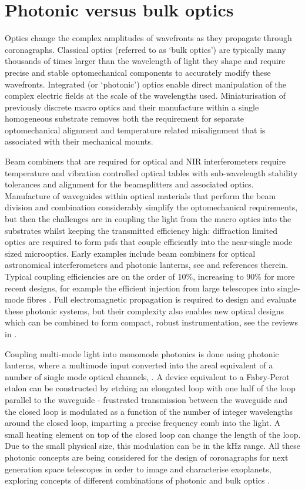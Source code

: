 \documentclass[letterpaper]{ar-1col}
\begin{document}
\section{Photonic versus bulk optics}

Optics change the complex amplitudes of wavefronts as they propagate through coronagraphs.
%
Classical optics (referred to as `bulk optics') are typically many thousands of times larger than the wavelength of light they shape and require precise and stable optomechanical components to accurately modify these wavefronts.
%
Integrated (or `photonic') optics enable direct manipulation of the complex electric fields at the scale of the wavelengths used.
%
Miniaturisation of previously discrete macro optics and their manufacture within a single homogeneous substrate removes both the requirement for separate optomechanical alignment and temperature related misalignment that is associated with their mechanical mounts.
%

Beam combiners that are required for optical and NIR interferometers require temperature and vibration controlled optical tables with sub-wavelength stability tolerances and alignment for the beamsplitters and associated optics.
%
Manufacture of waveguides within optical materials that perform the beam division and combination considerably simplify the optomechanical requirements, but then the challenges are in coupling the light from the macro optics into the substrates whilst keeping the transmitted efficiency high: diffraction limited optics are required to form \acp{psf} that couple efficiently into the near-single mode sized microoptics.
%
Early examples include beam combiners for optical astronomical interferometers \citep[for example the IOTA/IONIC beam combiner; ][]{Berger01} and photonic lanterns, see \citet{Leon-Saval10} and references therein.
%
Typical coupling efficiencies are on the order of 10\%, increasing to 90\% for more recent designs, for example the efficient injection from large telescopes into single-mode fibres \citep{Jovanovic17}.
%
Full electromagnetic propagation is required to design and evaluate these photonic systems, but their complexity also enables new optical designs which can be combined to form compact, robust instrumentation, see the reviews in \citet{Minardi21,Jovanovic23}.
%

Coupling multi-mode light into monomode photonics is done using photonic lanterns, where a multimode input converted into the areal equivalent of a number of single mode optical channels, \citep{Norris22}.
%
A device equivalent to a Fabry-Perot etalon can be constructed by etching an elongated loop with one half of the loop parallel to the waveguide - frustrated transmission between the waveguide and the closed loop is modulated as a function of the number of integer wavelengths around the closed loop, imparting a precise frequency comb into the light.
%
A small heating element on top of the closed loop can change the length of the loop.
%
Due to the small physical size, this modulation can be in the kHz range.
%
All these photonic concepts are being considered for the design of coronagraphs for next generation space telescopes in order to image and characterise exoplanets, exploring concepts of different combinations of photonic and bulk optics \citep{Desai23a}.
\end{document}
